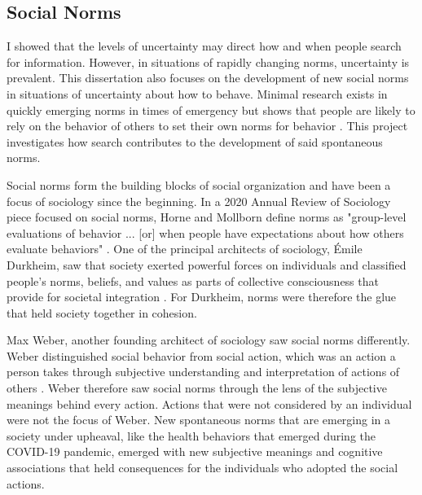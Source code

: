\subsection{Social Norms}
I showed that the levels of uncertainty may direct how and when people
search for information. However, in situations of rapidly changing norms,
uncertainty is prevalent. This dissertation also focuses on the development of
new social norms in situations of uncertainty about how to behave. 
Minimal research exists in quickly emerging
norms in times of emergency but shows that people are likely to rely on the
behavior of others to set their own norms for behavior \citep{alvarez2018,
horneNormsIntegratedFramework2020}. This project investigates how search
contributes to the development of said spontaneous norms.

Social norms form the building blocks of social organization and have been a
focus of sociology since the beginning. In a 2020 Annual Review of Sociology
piece focused on social norms, Horne and Mollborn define norms as "group-level
evaluations of behavior ... [or] when people have expectations about how others
evaluate behaviors" \citeyearpar[p. 468-69]{horneNormsIntegratedFramework2020}.
One of the principal architects of sociology, \'{E}mile Durkheim, saw that
society exerted powerful forces on individuals and classified people's norms,
beliefs, and values as parts of collective consciousness that provide for
societal integration \citeyearpar{durkheimSuicide1897, durkheimDivisionLaborSociety1933}.
For Durkheim, norms were therefore the glue that held society together in cohesion.

Max Weber, another founding architect of sociology saw social norms differently.
Weber distinguished social behavior from social action, which was an action a
person takes through subjective understanding and interpretation of actions of
others \citeyearpar{weber1978economy}. Weber therefore saw social norms through
the lens of the subjective meanings behind every action. Actions that were not
considered by an individual were not the focus of Weber. New spontaneous norms
that are emerging in a society under upheaval, like the health behaviors that
emerged during the COVID-19 pandemic, emerged with new subjective meanings and
cognitive associations that held consequences for the individuals who adopted
the social actions.

